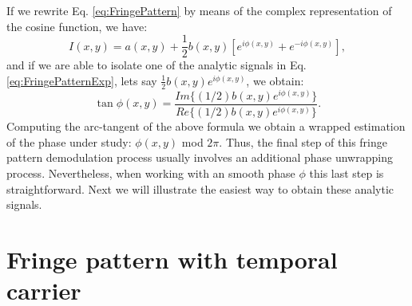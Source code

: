 If we rewrite Eq. \eqref{eq:FringePattern} by means of the complex representation of
the cosine function, we have:
\begin{equation}\label{eq:FringePatternExp}
 I(x,y)=a(x,y)+ \frac{1}{2} b(x,y)[e^{i \phi(x,y)} + e^{-i \phi(x,y)}],
\end{equation}
and if we are able to isolate one of the analytic signals in Eq. 
\eqref{eq:FringePatternExp}, lets say $\frac{1}{2} b(x,y)e^{i \phi(x,y)}$, we 
obtain:
\begin{equation}\label{eq:TanPhi}
 \tan \phi(x,y)=\frac{Im\{(1/2)b(x,y)e^{i \phi(x,y)}\}}{Re\{(1/2)b(x,y)
e^{i \phi(x,y)}\}}.
\end{equation}
Computing the arc-tangent of the above formula we obtain a wrapped estimation of
the phase under study: $\phi(x,y)$ mod $2\pi$. Thus, the final step of this fringe
pattern demodulation process usually involves an additional phase unwrapping 
process. Nevertheless, when working with an smooth phase $\phi$ this last step is 
straightforward. Next we will illustrate the easiest way to obtain these analytic 
signals.

\section{Fringe pattern with temporal carrier}

